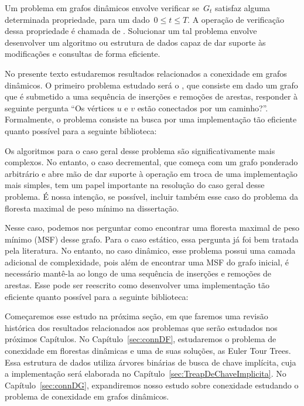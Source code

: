 Um problema em grafos dinâmicos envolve verificar se~$G_t$ satisfaz alguma determinada propriedade, para um dado~$0\leq t\leq T$.
A operação de verificação dessa propriedade é chamada de .
Solucionar um tal problema envolve desenvolver um algoritmo ou estrutura de dados capaz de dar suporte às modificações e consultas de forma eficiente.

No presente texto estudaremos resultados relacionados a conexidade em grafos dinâmicos.
O primeiro problema estudado será o , que consiste em dado um grafo que é submetido a uma sequência de inserções e remoções de arestas, responder à seguinte pergunta “Os vértices $u$ e $v$ estão conectados por um caminho?”. Formalmente, o problema consiste na busca por uma implementação tão eficiente quanto possível para a seguinte biblioteca: 

Os algoritmos para o caso geral desse problema são significativamente mais complexos. No entanto, o caso decremental, que começa com um grafo ponderado arbitrário e abre mão de dar suporte à operação \MSFaddEdge{} em troca de uma implementação mais simples, tem um papel importante na resolução do caso geral desse problema.  É nossa intenção, se possível, incluir também esse caso do problema da floresta maximal de peso mínimo na dissertação.

Nesse caso, podemos nos perguntar como encontrar uma floresta maximal de peso mínimo (MSF) desse grafo. Para o caso estático, essa pergunta já foi bem tratada pela literatura. No entanto, no caso dinâmico, esse problema possui uma camada adicional de complexidade, pois além de encontrar uma MSF do grafo inicial, é necessário mantê-la ao longo de uma sequência de inserções e remoções de arestas. Esse  pode ser reescrito como desenvolver uma implementação tão eficiente quanto possível para a seguinte biblioteca:

Começaremos esse estudo na próxima seção, em que faremos uma revisão histórica dos resultados relacionados aos problemas que serão estudados nos próximos Capítulos.
No Capítulo~\ref{sec:connDF}, estudaremos o problema de conexidade em florestas dinâmicas e uma de suas soluções, as Euler Tour Trees.
Essa estrutura de dados utiliza árvores binárias de busca de chave implícita, cuja a implementação será elaborada no Capítulo~\ref{sec:TreapDeChaveImplicita}.
No Capítulo~\ref{sec:connDG}, expandiremos nosso estudo sobre conexidade estudando o problema de conexidade em grafos dinâmicos.

